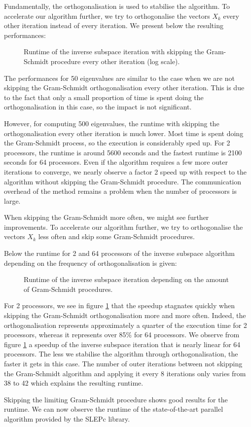 Fundamentally, the orthogonalisation is used to stabilise the algorithm.
\ifthesis
 To accelerate our algorithm further, we try to orthogonalise the vectors \(X_k\) every other iteration instead of every iteration.
 We present below the resulting performances:

 \begin{figure}[H]
  \centering
  
  \caption{Runtime of the inverse subspace iteration with skipping the Gram-Schmidt procedure every other iteration (log scale).}
 \end{figure}

 The performances for 50 eigenvalues are similar to the case when we are not skipping the Gram-Schmidt orthogonalisation every other iteration.
 This is due to the fact that only a small proportion of time is spent doing the orthogonalisation in this case, so the impact is not significant.

 However, for computing 500 eigenvalues, the runtime with skipping the orthogonalisation every other iteration is much lower.
 Most time is spent doing the Gram-Schmidt process, so the execution is considerably sped up.
 For 2 processors, the runtime is around 5600 seconds and the fastest runtime is 2100 seconds for 64 processors.
 Even if the algorithm requires a few more outer iterations to converge, we nearly observe a factor 2 speed up with respect to the algorithm without skipping the Gram-Schmidt procedure.
 The communication overhead of the method remains a problem when the number of processors is large.

 When skipping the Gram-Schmidt more often, we might see further improvements.
\else
 To accelerate our algorithm further, we try to orthogonalise the vectors \(X_k\) less often and skip some Gram-Schmidt procedures.
\fi

Below the runtime for 2 and 64 processors of the inverse subspace algorithm depending on the frequency of orthogonalisation is given:

\begin{figure}[H]
 \centering
 
 \caption{Runtime of the inverse subspace iteration depending on the amount of Gram-Schmidt procedures.}
 \label{fig:skip_gs}
\end{figure}

For 2 processors, we see in figure \ref{fig:skip_gs} that the speedup stagnates quickly when skipping the Gram-Schmidt orthogonalisation more and more often.
Indeed, the orthogonalisation represents approximately a quarter of the execution time for 2 processors, whereas it represents over 85\% for 64 processors.
We observe from figure \ref{fig:skip_gs} a speedup of the inverse subspace iteration that is nearly linear for 64 processors.
The less we stabilise the algorithm through orthogonalisation, the faster it gets in this case. 
The number of outer iterations between not skipping the Gram-Schmidt algorithm and applying it every 8 iterations only varies from 38 to 42 which explains the resulting runtime.

\ifthesis
 Skipping the limiting Gram-Schmidt procedure shows good results for the runtime.
 We can now observe the runtime of the state-of-the-art parallel algorithm provided by the SLEPc library.
\fi
